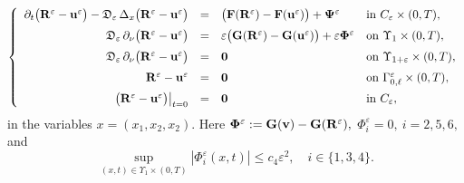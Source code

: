 \documentclass[reqno]{amsart}            %
\numberwithin{equation}{section}
\begin{document}
\begin{equation}\label{difference}
\left\{
    \begin{array}{rcll}
    \partial_t\big({\bf R}^\varepsilon - {\bf u}^\varepsilon\big) - \mathfrak{D}_\varepsilon \, \Delta_x\big({\bf R}^\varepsilon - {\bf u}^\varepsilon\big)
      &=& \big({\bf F}({\bf R}^\varepsilon) - {\bf F}({\bf u}^\varepsilon) \big) +
    {\bf \Psi}^\varepsilon
                    &\mbox{in} \ C_{{\varepsilon}}\times (0,T),
                    \\[2mm]
 \mathfrak{D}_\varepsilon \, \partial_{\nu}\big({\bf R}^\varepsilon - {\bf u}^\varepsilon\big) &=&   \varepsilon\big({\bf G}({\bf R}^\varepsilon) -
 {\bf G}({\bf u}^\varepsilon)\big) + \varepsilon  {\bf \Phi}^\varepsilon
                    & \mbox{on} \ \Upsilon_{1}\times (0,T),
                    \\[2mm]
 \mathfrak{D}_\varepsilon \,  \partial_{\nu}\big({\bf R}^\varepsilon - {\bf u}^\varepsilon\big) &=&   {\bf 0}
                    & \mbox{on} \ \Upsilon_{1+\varepsilon}\times (0,T),
                    \\[2mm]
  {\bf R}^\varepsilon - {\bf u}^\varepsilon &=& {\bf 0}& \text{on} \  \Gamma^\varepsilon_{0, \ell}\times (0,T),
 \\[2mm]
    \left. \big({\bf R}^\varepsilon - {\bf u}^\varepsilon\big)\right|_{t=0} &=&{\bf 0} &\mbox{in} \   C_{{\varepsilon}},
   \end{array}\right.
\end{equation}
in the variables $x=(x_1,x_2,x_2).$ Here ${\bf \Phi}^\varepsilon:= {\bf G}({\bf v}) - {\bf G}({\bf R}^\varepsilon),$  ${\Phi}^\varepsilon_i=0, \ i=2, 5, 6,$ and
$$
\sup_{(x,t) \in \Upsilon_{1} \times (0, T)} \left| {\Phi}^\varepsilon_i(x,t) \right| \le c_4 \varepsilon^2, \quad i\in \{1, 3, 4\}.
$$
\end{document}
